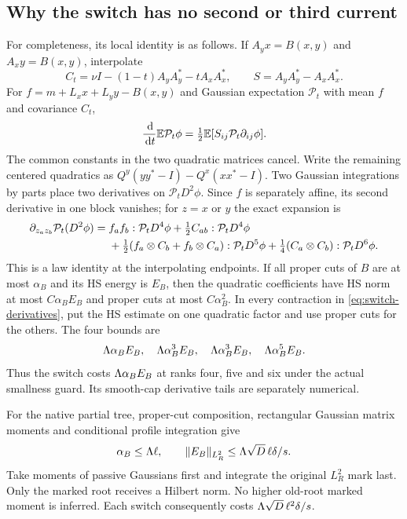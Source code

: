\documentclass[11pt]{article}
\numberwithin{equation}{section}
\theoremstyle{remark}\newtheorem{remark}[theorem]{Remark}
\newcommand{\norm}[1]{\lVert#1\rVert}
\begin{document}
\subsection{Why the switch has no second or third current}
For completeness, its local identity is as follows. If $A_yx=B(x,y)$ and $A_xy=B(x,y)$, interpolate
\[
 C_t=\nu I-(1-t)A_yA_y^*-tA_xA_x^*,
 \qquad S=A_yA_y^*-A_xA_x^*.
\]
For $f=m+L_xx+L_yy-B(x,y)$ and Gaussian expectation $\mathcal P_t$ with mean $f$ and covariance $C_t$,
\[
 \frac{\,\mathrm d}{\,\mathrm d t}\mathbb E\mathcal P_t\phi
 =\tfrac12\mathbb E[S_{ij}\mathcal P_t\partial_{ij}\phi].
\]
The common constants in the two quadratic matrices cancel. Write the remaining centered quadratics as $Q^y(yy^*-I)-Q^x(xx^*-I)$. Two Gaussian integrations by parts place two derivatives on $\mathcal P_tD^2\phi$. Since $f$ is separately affine, its second derivative in one block vanishes; for $z=x$ or $y$ the exact expansion is
\begin{align}\label{eq:switch-derivatives}
 \partial_{z_a z_b}\mathcal P_t(D^2\phi)
 ={}& f_a f_b:\mathcal P_tD^4\phi
   +\tfrac12 C_{ab}:\mathcal P_tD^4\phi\notag\\
 &+\tfrac12(f_a\otimes C_b+f_b\otimes C_a):\mathcal P_tD^5\phi
   +\tfrac14(C_a\otimes C_b):\mathcal P_tD^6\phi.
\end{align}
This is a law identity at the interpolating endpoints. If all proper cuts of $B$ are at most $\alpha_B$ and its HS energy is $E_B$, then the quadratic coefficients have HS norm at most $C\alpha_BE_B$ and proper cuts at most $C\alpha_B^2$. In every contraction in \eqref{eq:switch-derivatives}, put the HS estimate on one quadratic factor and use proper cuts for the others. The four bounds are
\[
 \Lambda\alpha_BE_B,\quad\Lambda\alpha_B^3E_B,\quad
 \Lambda\alpha_B^3E_B,\quad\Lambda\alpha_B^5E_B.
\]
Thus the switch costs $\Lambda\alpha_BE_B$ at ranks four, five and six under the actual smallness guard. Its smooth-cap derivative tails are separately numerical.

For the native partial tree, proper-cut composition, rectangular Gaussian matrix moments and conditional profile integration give
\[
 \alpha_B\le\LL\ell,\qquad
 \norm{E_B}_{L^2_R}\le\LL\sqrt D\,\ell\delta/s.
\]
Take moments of passive Gaussians first and integrate the original $L^2_R$ mark last. Only the marked root receives a Hilbert norm. No higher old-root marked moment is inferred. Each switch consequently costs $\Lambda\sqrt D\,\ell^2\delta/s$.
\end{document}
